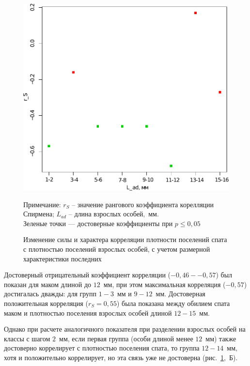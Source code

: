 \begin{figure}[p]
\begin{minipage}[b]{.46\linewidth}
	\begin{center}
		\includegraphics[width=\textwidth]{../White_Sea/spat/spearman_spat_2mm_1.pdf}
	\end{center}
	\end{minipage}
	\caption{Изменение силы и характера корреляции плотности поселений спата с плотностью поселений взрослых особей, с учетом размерной характеристики последних}
	\label{ris:spearman_size}
	
	\footnotesize{Примечание: $r_S$ – значение рангового коэффициента корелляции Спирмена;
 $L_{ad}$ – длина взрослых особей,~мм. \\
Зеленые точки --- достоверные коэффициенты при $p \le 0,05$}
	\end{figure}
Достоверный отрицательный коэффициент корреляции ($-0,46 - -0,57$) был показан для маком длиной до $12$~мм, при этом максимальная корреляция ($-0,57$) достигалась дважды: для групп $1-3$~мм и $9-12$~мм. 
Достоверная положительная корреляция ($r_S=0,55$) была показана между обилием спата маком и плотностью поселения взрослых особей длиной $12-15$~мм.

Однако при расчете аналогичного показателя при разделении взрослых особей на классы с шагом $2$~мм, если первая группа (особи длиной менее $12$~мм) также достоверно коррелирует с плотностью поселения спата, то группа $12-14$~мм, хотя и положительно коррелирует, но эта связь уже не достоверна (рис.~\ref{ris:spearman_size},~Б).

